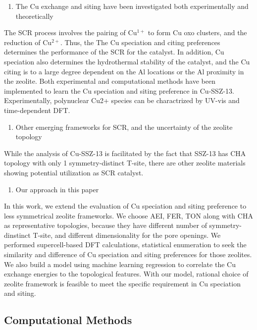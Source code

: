 \documentclass[12pt]{article}
\begin{document}
\begin{enumerate}[resume]
\item The Cu exchange and siting have been investigated both experimentally and theoretically
\end{enumerate}
The SCR process involves the pairing of Cu$^{1+}$ to form Cu oxo clusters, and the reduction of Cu$^{2+}$.\cite{Paolucciscience} Thus, the The Cu speciation and citing preferences determines the performance of the SCR for the catalyst. In addition, Cu speciation also determines the hydrothermal stability of the catalyst, and the Cu citing is to a large degree dependent on the Al locations or the Al proximity in the zeolite.\cite{Paolucci2016, Li2018JPCC} Both experimental and computational methods have been implemented to learn the Cu speciation and siting preference in Cu-SSZ-13. Experimentally, polynuclear Cu2+ species can be charactrized by UV-vis and time-dependent DFT.\cite{Hui-UV-vis}

\begin{enumerate}[resume]
\item Other emerging frameworks for SCR, and the uncertainty of the zeolite topology
\end{enumerate}
While the analysis of Cu-SSZ-13 is facilitated by the fact that SSZ-13 has CHA topology with only 1 symmetry-distinct T-site, there are other zeolite materials showing potential utilization as SCR catalyst. 

\begin{enumerate}[resume]
\item Our approach in this paper
\end{enumerate}
In this work, we extend the evaluation of Cu speciation and siting preference to less symmetrical zeolite frameworks. We choose AEI, FER, TON along with CHA as representative topologies, because they have different number of symmetry-dinstinct T-site, and different dimensionality for the pore openings. We performed supercell-based DFT calculations, statistical enumeration to seek the similarity and difference of Cu speciation and siting preferences for those zeolites. We also build a model using machine learning regression to correlate the Cu exchange energies to the topological features. With our model, rational choice of zeolite framework is feasible to meet the specific requirement in Cu speciation and siting.

\subsection*{Computational Methods}
\end{document}

